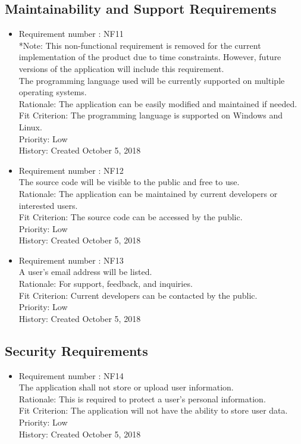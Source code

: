 \documentclass[12pt, titlepage]{article}
\begin{document}
\subsection{Maintainability and Support Requirements}
\begin{itemize}
\item Requirement number : NF11\\
\color{blue}
*Note: 
This non-functional requirement is removed for the current implementation of the product due to time constraints. However, future versions of the application will include this requirement.\\
\color{black}
The programming language used will be currently supported on multiple operating systems.\\
Rationale: The application can be easily modified and maintained if needed.\\
Fit Criterion: The programming language is supported on Windows and Linux.\\
Priority: Low\\
History: Created October 5, 2018
\item Requirement number : NF12\\
The source code will be visible to the public and free to use.\\
Rationale: The application can be maintained by current developers or interested users.\\
Fit Criterion: The source code can be accessed by the public.\\
Priority: Low\\
History: Created October 5, 2018
\item Requirement number : NF13\\
A user's email address will be listed.\\
Rationale: For support, feedback, and inquiries.\\ 
Fit Criterion: Current developers can be contacted by the public.\\
Priority: Low\\
History: Created October 5, 2018

\end{itemize}
\subsection{Security Requirements}
\begin{itemize}
\item Requirement number : NF14\\
The application shall not store or upload user information.\\
Rationale: This is required to protect a user's personal information.\\
Fit Criterion: The application will not have the ability to store user data.\\
Priority: Low\\
History: Created October 5, 2018
\end{itemize}
\end{document}
